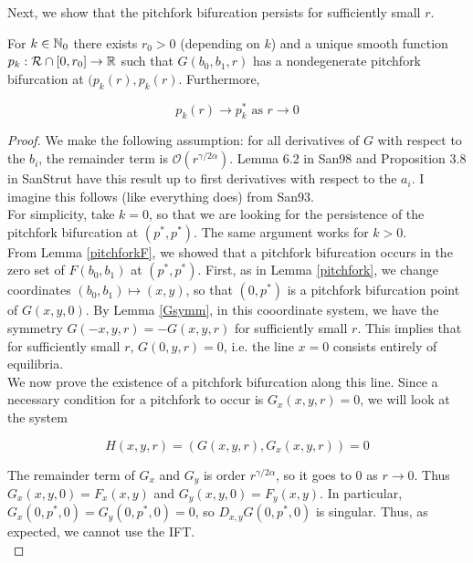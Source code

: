 \documentclass[thesis.tex]{subfiles}
\begin{document}
Next, we show that the pitchfork bifurcation persists for sufficiently small $r$.


\begin{lemma}\label{pitchpersist}

For $k \in {\mathbb N}_0$ there exists $r_0 > 0$ (depending on $k$) and a unique smooth function $p_k: \mathcal{R} \cap [0, r_0] \rightarrow {\mathbb R}$ such that $G(b_0, b_1, r)$ has a nondegenerate pitchfork bifurcation at $(p_k(r),p_k(r)$. Furthermore, 

\begin{equation*}
p_k(r) \rightarrow p_k^* \text{ as } r \rightarrow 0
\end{equation*}

\begin{proof}
We make the following assumption: for all derivatives of $G$ with respect to the $b_i$, the remainder term is $\mathcal{O}(r^{\gamma / 2 \alpha})$. Lemma 6.2 in San98 and Proposition 3.8 in SanStrut have this result up to first derivatives with respect to the $a_i$. I imagine this follows (like everything does) from San93.\\

For simplicity, take $k = 0$, so that we are looking for the persistence of the pitchfork bifurcation at $(p^*, p^*)$. The same argument works for $k > 0$.\\

From Lemma \ref{pitchforkF}, we showed that a pitchfork bifurcation occurs in the zero set of $F(b_0, b_1)$ at $(p^*, p^*)$. First, as in Lemma \ref{pitchfork}, we change coordinates $(b_0, b_1) \mapsto (x, y)$, so that $(0, p^*)$ is a pitchfork bifurcation point of $G(x, y, 0)$. By Lemma \ref{Gsymm}, in this cooordinate system, we have the symmetry $G(-x, y, r) = -G(x, y, r)$ for sufficiently small $r$. This implies that for sufficiently small $r$, $G(0, y, r) = 0$, i.e. the line $x = 0$ consists entirely of equilibria.\\

We now prove the existence of a pitchfork bifurcation along this line. Since a necessary condition for a pitchfork to occur is $G_x(x, y, r) = 0$, we will look at the system

\begin{equation}
H(x,y,r) = (G(x,y,r), G_x(x,y,r)) = 0
\end{equation}

The remainder term of $G_x$ and $G_y$ is order $r^{\gamma/2 \alpha}$, so it goes to 0 as $r \rightarrow 0$. Thus $G_x(x,y,0) = F_x(x,y)$ and $G_y(x,y,0) = F_y(x,y)$. In particular, $G_x(0,p^*,0) = G_y(0, p^*, 0) = 0$, so $D_{x,y}G(0,p^*,0)$ is singular. Thus, as expected, we cannot use the IFT.\\


\end{proof}
\end{lemma}
\end{document}
